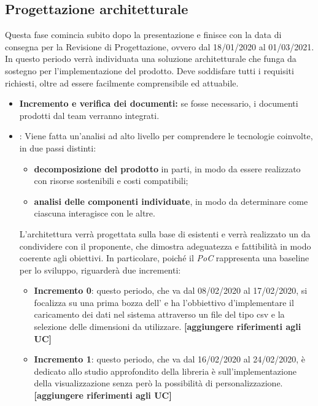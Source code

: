 \subsection{Progettazione architetturale}
Questa fase comincia subito dopo la presentazione e finisce con la data di consegna per la Revisione di Progettazione, ovvero dal 18/01/2020 al 01/03/2021.\\
In questo periodo verrà individuata una soluzione architetturale che funga da sostegno per l'implementazione del prodotto. Deve soddisfare tutti i requisiti richiesti, oltre ad essere facilmente comprensibile ed attuabile. 
\begin{itemize}
\item \textbf{Incremento e verifica dei documenti:} se fosse necessario, i documenti prodotti dal team verranno integrati.

 \item {}: Viene fatta un'analisi ad alto livello per comprendere le tecnologie coinvolte, in due passi distinti:
\begin{itemize}
 \item \textbf{decomposizione del prodotto} in parti, in modo da essere realizzato con risorse sostenibili e costi compatibili;
 \item \textbf{analisi delle componenti individuate}, in modo da determinare come ciascuna interagisce con le altre.  
\end{itemize}
L'architettura verrà progettata sulla base di  esistenti e verrà realizzato un  da condividere con il proponente, che dimostra adeguatezza e fattibilità in modo coerente agli obiettivi. In particolare, poiché il \textit{PoC} rappresenta una baseline per lo sviluppo, riguarderà due incrementi:
\begin{itemize}
	\item \textbf{Incremento 0}: questo periodo, che va dal 08/02/2020 al 17/02/2020, si focalizza su una prima bozza dell' e ha l'obbiettivo d'implementare il caricamento dei dati nel sistema attraverso un file del tipo csv e la selezione delle dimensioni da utilizzare. \textbf{[aggiungere riferimenti agli UC]}
	\item \textbf{Incremento 1}: questo periodo, che va dal 16/02/2020 al 24/02/2020, è dedicato allo studio approfondito della libreria  è sull'implementazione della visualizzazione  senza però la possibilità di personalizzazione. \textbf{[aggiungere riferimenti agli UC]}
\end{itemize} 

\end{itemize}


